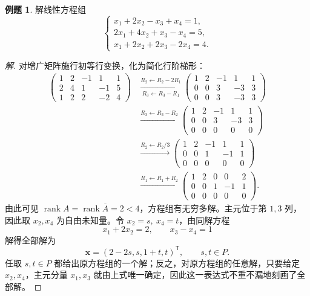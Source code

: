 \documentclass[UTF8, fontset=fandol, a4paper, 12pt]{ctexart}
\newcommand{\rank}{\operatorname{rank}}
\newcommand{\vx}{\boldsymbol{x}}
\theoremstyle{definition}
\newtheorem{example}[definition]{例题}
\begin{document}
\begin{example}\label{ex:nonhom}
解线性方程组
\[
 \begin{cases}
 x_1+2x_2-x_3+x_4=1,\\
 2x_1+4x_2+x_3-x_4=5,\\
 x_1+2x_2+2x_3-2x_4=4.
 \end{cases}
\]
\end{example}
\begin{proof}[解]
对增广矩阵施行初等行变换，化为简化行阶梯形：
\begin{align*}
\left(\begin{array}{rrrr|r}1&2&-1&1&1\\2&4&1&-1&5\\1&2&2&-2&4\end{array}\right)
&\xrightarrow[R_3\leftarrow R_3-R_1]{R_2\leftarrow R_2-2R_1}
\left(\begin{array}{rrrr|r}1&2&-1&1&1\\0&0&3&-3&3\\0&0&3&-3&3\end{array}\right)\\
&\xrightarrow{R_3\leftarrow R_3-R_2}
\left(\begin{array}{rrrr|r}1&2&-1&1&1\\0&0&3&-3&3\\0&0&0&0&0\end{array}\right)\\
&\xrightarrow{R_2\leftarrow R_2/3}
\left(\begin{array}{rrrr|r}1&2&-1&1&1\\0&0&1&-1&1\\0&0&0&0&0\end{array}\right)\\
&\xrightarrow{R_1\leftarrow R_1+R_2}
\left(\begin{array}{rrrr|r}1&2&0&0&2\\0&0&1&-1&1\\0&0&0&0&0\end{array}\right).
\end{align*}
由此可见 $\rank A=\rank\overline A=2<4$，方程组有无穷多解。主元位于第 $1,3$ 列，因此取 $x_2,x_4$ 为自由未知量。令 $x_2=s,\ x_4=t$，由同解方程
\[
 x_1+2x_2=2,\qquad x_3-x_4=1
\]
解得全部解为
\[
 \boxed{\vx=(2-2s,s,1+t,t)^{\mathsf T},\qquad s,t\in P.}
\]
任取 $s,t\in P$ 都给出原方程组的一个解；反之，对原方程组的任意解，只要给定 $x_2,x_4$，主元分量 $x_1,x_3$ 就由上式唯一确定，因此这一表达式不重不漏地刻画了全部解。
\end{proof}
\end{document}
